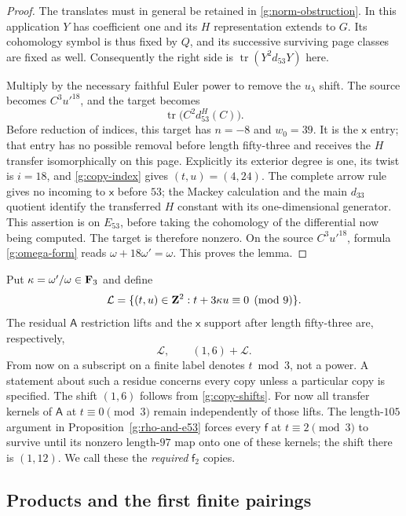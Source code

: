\begin{proof}
The translates must in general be retained in
\eqref{g:norm-obstruction}.  In this application $Y$
has coefficient one and its $H$ representation extends
to $G$.  Its cohomology symbol is thus fixed by $Q$,
and its successive surviving page classes are fixed
as well.  Consequently the right side is
$\operatorname{tr}(Y^2d_{53}Y)$ here.

Multiply by the necessary faithful Euler power to
remove the $u_\lambda$ shift.  The source becomes
$C^3u'^{18}$, and the target becomes
\[
 \operatorname{tr}\bigl(C^2d_{53}^H(C)\bigr).
\]
Before reduction of indices, this target has
$n=-8$ and $w_0=39$.  It is the $\mathsf x$ entry;
that entry has no possible removal before length
fifty-three and receives the $H$ transfer
isomorphically on this page.  Explicitly its exterior
degree is one, its twist is $i=18$, and
\eqref{g:copy-index} gives $(t,u)=(4,24)$.
The complete arrow rule gives no incoming to
$\mathsf x$ before $53$; the Mackey calculation and
the main $d_{33}$ quotient identify the transferred
$H$ constant with its one-dimensional generator.
This assertion is on $E_{53}$, before taking the
cohomology of the differential now being computed.
The target is therefore
nonzero.  On the source $C^3u'^{18}$, formula
\eqref{g:omega-form} reads
$\omega+18\omega'=\omega$.  This proves the lemma.
\end{proof}

Put $\kappa=\omega'/\omega\in\mathbf F_3$ and define
\begin{equation}\label{g:lattice}
 \mathcal L=\{(t,u)\in\mathbf Z^2:t+3\kappa u\equiv0\pmod9\}.
\end{equation}
The residual $\mathsf A$ restriction lifts and the
$\mathsf x$ support after length fifty-three are,
respectively,
\begin{equation}\label{g:A-x-support}
 \mathcal L,\qquad(1,6)+\mathcal L.
\end{equation}
From now on a subscript on a finite label denotes $t\bmod3$, not a
power.  A statement about such a residue concerns every copy unless
a particular copy is specified.
The shift $(1,6)$ follows from
\eqref{g:copy-shifts}.  For now all transfer kernels of
$\mathsf A$ at $t\equiv0\pmod3$ remain independently
of those lifts.  The length-$105$ argument in
Proposition~\ref{g:rho-and-e53} forces every
$\mathsf f$ at $t\equiv2\pmod3$ to survive until
its nonzero length-$97$ map onto one of these kernels;
the shift there is $(1,12)$.  We call these the
\emph{required} $\mathsf f_2$ copies.

\subsection{Products and the first finite pairings}

